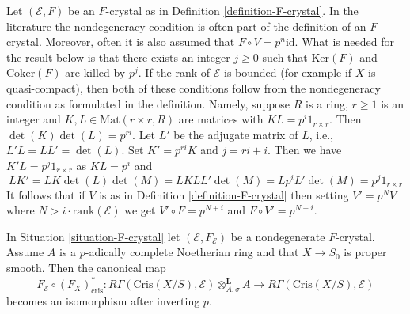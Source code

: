 \begin{remark}
\label{remark-F-crystal-variants}
Let $(\mathcal{E}, F)$ be an $F$-crystal as in
Definition \ref{definition-F-crystal}.
In the literature the nondegeneracy condition is often part of the
definition of an $F$-crystal. Moreover, often it is also assumed that
$F \circ V = p^n\text{id}$. What is needed for the result below is
that there exists an integer $j \geq 0$ such that $\text{Ker}(F)$ and
$\text{Coker}(F)$ are killed by $p^j$. If the rank of $\mathcal{E}$
is bounded (for example if $X$ is quasi-compact), then both of these
conditions follow from the nondegeneracy condition as formulated in
the definition. Namely, suppose $R$ is a ring, $r \geq 1$ is an integer and
$K, L \in \text{Mat}(r \times r, R)$ are matrices with
$K L = p^i 1_{r \times r}$. Then $\det(K)\det(L) = p^{ri}$. 
Let $L'$ be the adjugate matrix of $L$, i.e.,
$L' L = L L' = \det(L)$. Set $K' = p^{ri} K$ and $j = ri + i$.
Then we have $K' L = p^j 1_{r \times r}$ as $K L = p^i$ and
$$
L K' = L K \det(L) \det(M) = L K L L' \det(M) = L p^i L' \det(M) =
p^j 1_{r \times r}
$$
It follows that if $V$ is as in Definition \ref{definition-F-crystal}
then setting $V' = p^N V$ where $N > i \cdot \text{rank}(\mathcal{E})$
we get $V' \circ F = p^{N + i}$ and $F \circ V' = p^{N + i}$.
\end{remark}

\begin{theorem}
\label{theorem-cohomology-F-crystal}
In Situation \ref{situation-F-crystal} let $(\mathcal{E}, F_\mathcal{E})$
be a nondegenerate $F$-crystal. Assume $A$ is a $p$-adically complete
Noetherian ring and that $X \to S_0$ is proper smooth. Then
the canonical map
$$
F_\mathcal{E} \circ (F_X)_{\text{cris}}^* :
R\Gamma(\text{Cris}(X/S), \mathcal{E}) \otimes^\mathbf{L}_{A, \sigma} A
\longrightarrow
R\Gamma(\text{Cris}(X/S), \mathcal{E})
$$
becomes an isomorphism after inverting $p$.
\end{theorem}

